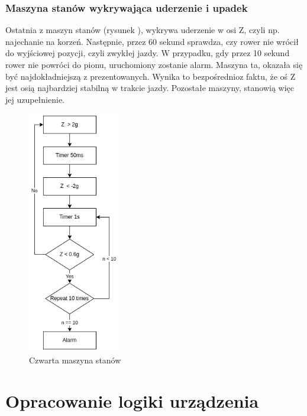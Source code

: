 \subsubsection{Maszyna stanów wykrywająca uderzenie i upadek}
Ostatnia z maszyn stanów (rysunek ), wykrywa uderzenie w osi Z, czyli np. najechanie na korzeń. Następnie, przez 60 sekund sprawdza, czy rower nie wrócił do wyjściowej pozycji, czyli zwykłej jazdy. W przypadku, gdy przez 10 sekund rower nie powróci do pionu, uruchomiony zostanie alarm. Maszyna ta, okazała się być najdokładniejszą z prezentowanych. Wynika to bezpośrednioz faktu, że oś Z jest osią najbardziej stabilną w trakcie jazdy. Pozostałe maszyny, stanowią więc jej uzupełnienie.
\begin{figure}[h]
    \centering
    \includegraphics[width=4cm]{Graphics/Z_axis_FSM.png}
    \caption{Czwarta maszyna stanów}
    \label{img:fsm4}
\end{figure}

\section{Opracowanie logiki urządzenia}

